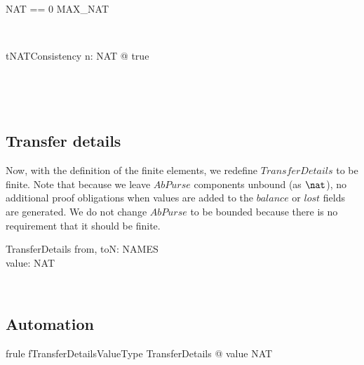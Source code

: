 %
\begin{LNewADef}
\begin{zed}
    NAT == 0 \upto MAX\_NAT
\end{zed}~\end{LNewADef}

\begin{LNewThm}
\begin{theorem}{tNATConsistency}
    \exists  n: NAT @ true
\end{theorem}~\end{LNewThm}
%

\begin{LRRT}
~\end{LRRT}

\subsection{Transfer details}\label{ch3.transferdetails}

Now, with the definition of the finite elements, we redefine
$TransferDetails$ to be finite. Note that because we leave
$AbPurse$ components unbound (as $\nat$), no additional proof
obligations when values are added to the $balance$ or $lost$ fields
are generated. We do not change $AbPurse$ to be bounded because
there is no requirement that it should be finite.
%
\begin{LSDef}
\begin{schema}{TransferDetails}
   from, toN: NAMES\\
   value: NAT
\end{schema}~\end{LSDef}

\subsection*{Automation}

\begin{LFRT}
\begin{theorem}{frule fTransferDetailsValueType}
    \forall TransferDetails @ value \in NAT
\end{theorem}~\end{LFRT}

